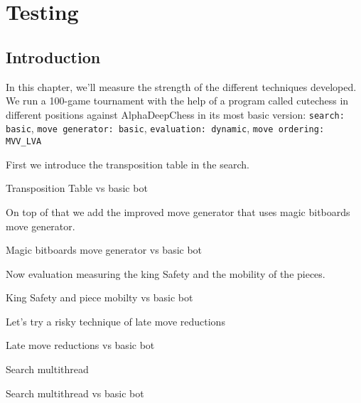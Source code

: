 \chapter{Testing}
\label{cap:testing}
\section{Introduction}

In this chapter, we'll measure the strength of the different techniques developed. We run a 100-game tournament with the help of a program called cutechess in different positions against AlphaDeepChess in its most basic version: \texttt{search: basic}, \texttt{move generator: basic}, \texttt{evaluation: dynamic}, \texttt{move ordering: MVV\_LVA}

\vspace{1em}

First we introduce the transposition table in the search.

\vspace{1em}

Transposition Table vs basic bot\\
\medskip

\vspace{1em}

On top of that we add the improved move generator that uses magic bitboards move generator.

\vspace{1em}

Magic bitboards move generator vs basic bot\\
\medskip

Now evaluation measuring the king Safety and the mobility of the pieces.

\vspace{1em}

King Safety and piece mobilty vs basic bot\\
\medskip

Let's try a risky technique of late move reductions

\vspace{1em}

Late move reductions vs basic bot\\
\medskip

Search multithread

\vspace{1em}

Search multithread vs basic bot\\
